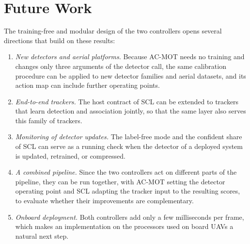 \section{Future Work}\label{sec:conc-future}
The training-free and modular design of the two controllers opens several directions that build on these results:
\begin{enumerate}
\item \emph{New detectors and aerial platforms.} Because AC-MOT needs no training and changes only three arguments of the detector call, the same calibration procedure can be applied to new detector families and aerial datasets, and its action map can include further operating points.
\item \emph{End-to-end trackers.} The host contract of SCL can be extended to trackers that learn detection and association jointly, so that the same layer also serves this family of trackers.
\item \emph{Monitoring of detector updates.} The label-free mode and the confident share of SCL can serve as a running check when the detector of a deployed system is updated, retrained, or compressed.
\item \emph{A combined pipeline.} Since the two controllers act on different parts of the pipeline, they can be run together, with AC-MOT setting the detector operating point and SCL adapting the tracker input to the resulting scores, to evaluate whether their improvements are complementary.
\item \emph{Onboard deployment.} Both controllers add only a few milliseconds per frame, which makes an implementation on the processors used on board UAVs a natural next step.
\end{enumerate}
